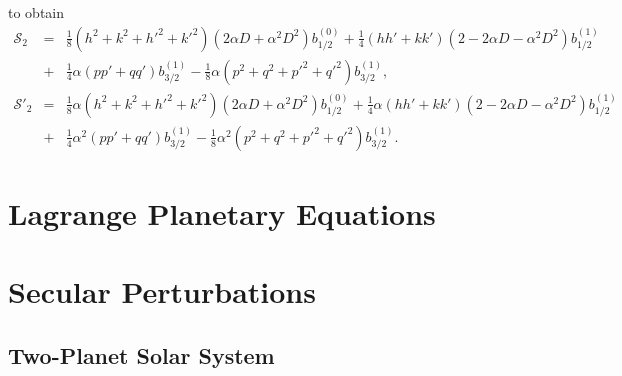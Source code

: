\documentclass [12pt, a4paper] {article}
\begin{document}
to obtain 
\begin {eqnarray}
    \mathcal{S}_2 
    &=&
    \frac{1}{8}(h^2 + k^2 + h'^2 + k'^2)(2\alpha D + \alpha^2D^2)b_{1/2}^{(0)}
    + 
    \frac{1}{4}(hh' + kk')(2 - 2\alpha D - \alpha^2D^2)b_{1/2}^{(1)}
    \\\nonumber 
    &+&
    \frac{1}{4}\alpha(pp' + qq')b_{3/2}^{(1)} 
    -
    \frac{1}{8}\alpha (p^2 + q^2 + p'^2 + q'^2)b_{3/2}^{(1)},
    \\
    \mathcal{S}'_2
    &=&
    \frac{1}{8}\alpha(h^2 + k^2 + h'^2 + k'^2)(2\alpha D + \alpha^2D^2)b_{1/2}^{(0)}
    + 
    \frac{1}{4}\alpha(hh' + kk')(2 - 2\alpha D - \alpha^2D^2)b_{1/2}^{(1)}
    \\\nonumber 
    &+&
    \frac{1}{4}\alpha^2(pp' + qq')b_{3/2}^{(1)} 
    -
    \frac{1}{8}\alpha^2(p^2 + q^2 + p'^2 + q'^2)b_{3/2}^{(1)}.
\end {eqnarray}
\newpage
\section{Lagrange Planetary Equations}
\newpage
\section{Secular Perturbations}
\subsection{Two-Planet Solar System}
\end{document}
